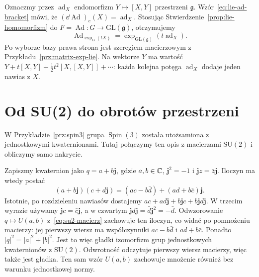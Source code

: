 Oznaczmy przez $\operatorname{ad}_X$ endomorfizm
$Y\mapsto[X,Y]$ przestrzeni $\mathfrak g$.
Wzór~\eqref{eq:lie-ad-bracket} mówi, że
$(\dd\operatorname{Ad})_e(X)=\operatorname{ad}_X$.
Stosując Stwierdzenie~\ref{prop:lie-homomorfizm}
do $F=\operatorname{Ad}:G\to\mathrm{GL}(\mathfrak g)$, otrzymujemy
\[
 \operatorname{Ad}_{\exp_G(tX)}
 =\exp_{\mathrm{GL}(\mathfrak g)}(t\operatorname{ad}_X).
\]
Po wyborze bazy prawa strona jest szeregiem macierzowym
z Przykładu~\ref{prz:matrix-exp-lie}. Na wektorze $Y$
ma wartość $Y+t[X,Y]+\tfrac12t^2[X,[X,Y]]+\cdots$:
każda kolejna potęga $\operatorname{ad}_X$ dodaje jeden nawias z $X$.

\section{Od SU(2) do obrotów przestrzeni}
\label{sec:su2-so3-lie}

W Przykładzie~\ref{prz:spin3} grupa
$\operatorname{Spin}(3)$ została utożsamiona z jednostkowymi
kwaternionami. Tutaj połączymy ten opis z macierzami
$\mathrm{SU}(2)$ i obliczymy samo nakrycie.

Zapiszmy kwaternion jako $q=a+b\mathbf j$, gdzie $a,b\in\mathbb{C}$,
$\mathbf j^2=-1$ i $\mathbf jz=\bar z\mathbf j$.
Iloczyn ma wtedy postać
\[
 (a+b\mathbf j)(c+d\mathbf j)
 =(ac-b\bar d)+(ad+b\bar c)\mathbf j.
\]
Istotnie, po rozdzieleniu nawiasów dostajemy $ac+ad\mathbf j
+b\mathbf jc+b\mathbf jd\mathbf j$.
W trzecim wyrazie używamy $\mathbf jc=\bar c\mathbf j$,
a w czwartym $\mathbf jd\mathbf j=\bar d\mathbf j^2=-\bar d$.
Odwzorowanie $q\mapsto U(a,b)$ z~\eqref{eq:su2-macierz}
zachowuje ten iloczyn, co widać po pomnożeniu macierzy:
jej pierwszy wiersz ma współczynniki $ac-b\bar d$
i $ad+b\bar c$. Ponadto
$|q|^2=|a|^2+|b|^2$. Jest to więc gładki izomorfizm
grup jednostkowych kwaternionów z $\mathrm{SU}(2)$.
Odwrotność odczytuje pierwszy wiersz macierzy, więc także
jest gładka. Ten sam wzór $U(a,b)$ zachowuje mnożenie
również bez warunku jednostkowej normy.

